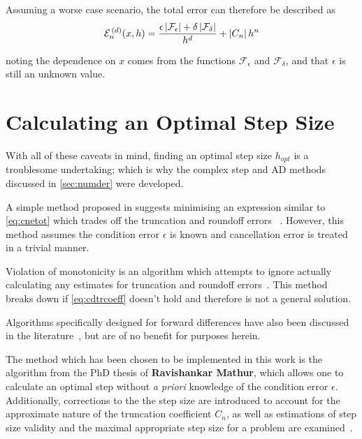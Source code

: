 Assuming a worse case scenario, the total error can therefore be described as
\begin{equation}
\mathcal{E}_n^{\,(d)}(x,h) = \frac{\epsilon\left\lvert \mathcal{F}_\epsilon\right\rvert+\delta\left\lvert \mathcal{F}_\delta\right\rvert}{h^d} + \left\lvert C_n\right\rvert h^n\label{eq:cnetot}
\end{equation}

noting the dependence on $x$ comes from the functions $\mathcal{F}_\epsilon$ and $\mathcal{F}_\delta$, and that $\epsilon$ is still an unknown value.

\section{Calculating an Optimal Step Size}\label{sec:hopt}

With all of these caveats in mind, finding an optimal step size $h_{opt}$ is a troublesome undertaking; which is why the complex step and AD methods discussed in \cref{sec:numder} were developed.

A simple method proposed in \citeauthor{Gill1982} suggests minimising an expression similar to \cref{eq:cnetot} which trades off the truncation and roundoff errors ~\cite{Gill1982,Mathews2004}.
However, this method assumes the condition error $\epsilon$ is known and cancellation error is treated in a trivial manner.

Violation of monotonicity is an algorithm which attempts to ignore actually calculating any estimates for truncation and roundoff errors~\cite{Stepleman1979}. This method breaks down if \cref{eq:cdtrcoeff} doesn't hold and therefore is not a general solution.

Algorithms specifically designed for forward differences have also been discussed in the literature~\cite{Barton1992}, but are of no benefit for purposes herein.

The method which has been chosen to be implemented in this work is the algorithm from the PhD thesis of \textbf{Ravishankar Mathur}, which allows one to calculate an optimal step without \emph{a priori} knowledge of the condition error $\epsilon$.
Additionally, corrections to the the step size are introduced to account for the approximate nature of the truncation coefficient $C_n$, as well as estimations of step size validity and the maximal appropriate step size for a problem are examined~\cite{Mathur2012}.

